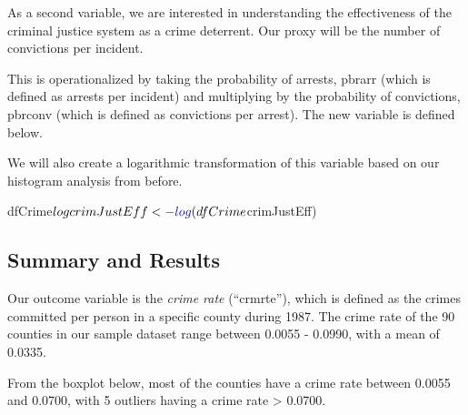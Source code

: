 \documentclass[]{article}
\newenvironment{Shaded}{}{}
\newcommand{\KeywordTok}[1]{\textcolor[rgb]{0.00,0.00,1.00}{#1}}
\newcommand{\NormalTok}[1]{#1}
\newcommand{\OperatorTok}[1]{#1}
\newcommand{\StringTok}[1]{\textcolor[rgb]{0.00,0.50,0.50}{#1}}
\begin{document}
As a second variable, we are interested in understanding the
effectiveness of the criminal justice system as a crime deterrent. Our
proxy will be the number of convictions per incident.

This is operationalized by taking the probability of arrests, pbrarr
(which is defined as arrests per incident) and multiplying by the
probability of convictions, pbrconv (which is defined as convictions per
arrest). The new variable is defined below.

\begin{Shaded}
\end{Shaded}

We will also create a logarithmic transformation of this variable based
on our histogram analysis from before.

\begin{Shaded}
\begin{Highlighting}[]
\NormalTok{dfCrime}\OperatorTok{$}\NormalTok{logcrimJustEff<-}\KeywordTok{log}\NormalTok{(dfCrime}\OperatorTok{$}\NormalTok{crimJustEff)}
\end{Highlighting}
\end{Shaded}

\hypertarget{summary-and-results}{%
\subsection{Summary and Results}\label{summary-and-results}}

Our outcome variable is the \emph{crime rate} (``crmrte''), which is
defined as the crimes committed per person in a specific county during
1987. The crime rate of the 90 counties in our sample dataset range
between 0.0055 - 0.0990, with a mean of 0.0335.

From the boxplot below, most of the counties have a crime rate between
0.0055 and 0.0700, with 5 outliers having a crime rate \textgreater{}
0.0700.
\end{document}
